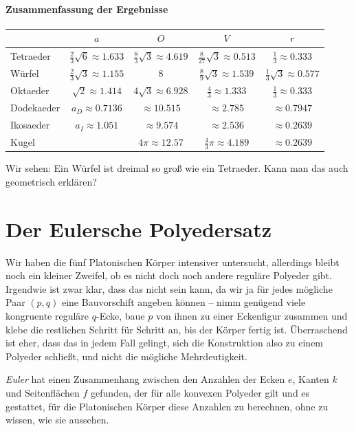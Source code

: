 \documentclass[11pt]{article}
\begin{document}
\paragraph{Zusammenfassung der Ergebnisse}
\begin{center}
  \begin{tabular}{|l|c|c|c|c|}\hline
    & $a$ & $O$ & $V$ & $r$ \\\hline
    Tetraeder & $\frac23\sqrt{6}\approx 1.633$ & $\frac83\sqrt{3} \approx
    4.619$ & $\frac{8}{27}\sqrt{3} \approx 0.513$ & $\frac13 \approx 0.333$\\ 
    Würfel & $\frac23\sqrt{3}\approx 1.155$ & $8$ & $\frac{8}{9}\sqrt{3}
    \approx 1.539$ & $\frac13\sqrt{3} \approx 0.577$ \\
    Oktaeder & $\sqrt{2}\approx 1.414$ & $4\sqrt{3}\approx 6.928$ &
    $\frac43 \approx 1.333$ & $\frac13 \approx 0.333$ \\
    Dodekaeder & $a_D\approx 0.7136$ & $\approx 10.515$ & $\approx 2.785$ &
    $\approx 0.7947$ \\ 
    Ikosaeder & $a_I\approx 1.051$ & $\approx 9.574$ & $ \approx 2.536$ &
    $\approx 0.2639$ \\
    Kugel &  & $4\pi\approx 12.57$ & $ \frac43\pi \approx 4.189$ &
    $\approx 0.2639$ \\\hline 
  \end{tabular}
\end{center}

Wir sehen: Ein Würfel ist dreimal so groß wie ein Tetraeder.  Kann man das
auch geometrisch erklären? 

\section*{Der Eulersche Polyedersatz}

Wir haben die fünf Platonischen Körper intensiver untersucht, allerdings
bleibt noch ein kleiner Zweifel, ob es nicht doch noch andere reguläre
Polyeder gibt.  Irgendwie ist zwar klar, dass das nicht sein kann, da wir ja
für jedes mögliche Paar $(p,q)$ eine Bauvorschift angeben können -- nimm
genügend viele kongruente reguläre $q$-Ecke, baue $p$ von ihnen zu einer
Eckenfigur zusammen und klebe die restlichen Schritt für Schritt an, bis der
Körper fertig ist.  Überraschend ist eher, dass das in jedem Fall gelingt,
sich die Konstruktion also zu einem Polyeder schließt, und nicht die mögliche
Mehrdeutigkeit. 

\emph{Euler} hat einen Zusammenhang zwischen den Anzahlen der Ecken $e$,
Kanten $k$ und Seitenflächen $f$ gefunden, der für alle konvexen Polyeder gilt
und es gestattet, für die Platonischen Körper diese Anzahlen zu berechnen,
ohne zu wissen, wie sie aussehen.
\end{document}
